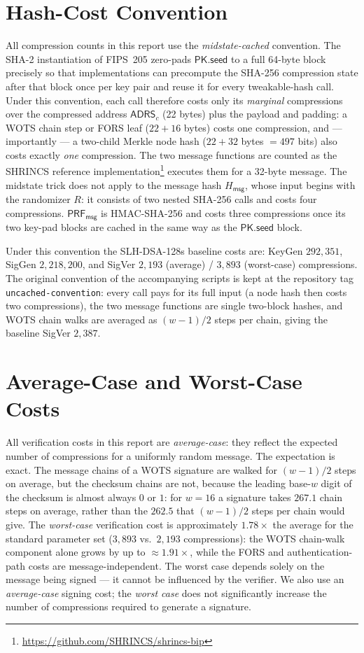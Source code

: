 \section{Hash-Cost Convention} \label{app:hash-convention}
All compression counts in this report use the \emph{midstate-cached} convention. The SHA-2 instantiation of FIPS~205 zero-pads $\mathsf{PK.seed}$ to a full 64-byte block precisely so that implementations can precompute the SHA-256 compression state after that block once per key pair and reuse it for every tweakable-hash call. Under this convention, each call therefore costs only its \emph{marginal} compressions over the compressed address $\mathsf{ADRS}_c$ (22 bytes) plus the payload and padding: a WOTS chain step or FORS leaf ($22 + 16$ bytes) costs one compression, and — importantly — a two-child Merkle node hash ($22 + 32$ bytes $= 497$ bits) also costs exactly \emph{one} compression. The two message functions are counted as the SHRINCS reference implementation\footnote{\url{https://github.com/SHRINCS/shrincs-bip}} executes them for a 32-byte message. The midstate trick does not apply to the message hash $H_{\mathsf{msg}}$, whose input begins with the randomizer $R$: it consists of two nested SHA-256 calls and costs four compressions. $\mathsf{PRF}_{\mathsf{msg}}$ is HMAC-SHA-256 and costs three compressions once its two key-pad blocks are cached in the same way as the $\mathsf{PK.seed}$ block.

Under this convention the SLH-DSA-128s baseline costs are: KeyGen $292{,}351$, SigGen $2{,}218{,}200$, and SigVer $2{,}193$ (average) / $3{,}893$ (worst-case) compressions. The original convention of the accompanying scripts is kept at the repository tag \texttt{uncached-convention}: every call pays for its full input (a node hash then costs two compressions), the two message functions are single two-block hashes, and WOTS chain walks are averaged as $(w-1)/2$ steps per chain, giving the baseline SigVer $2{,}387$.

\section{Average-Case and Worst-Case Costs} \label{app:average-case}
All verification costs in this report are \emph{average-case}: they reflect the expected number of compressions for a uniformly random message.
The expectation is exact. The message chains of a WOTS signature are walked for $(w-1)/2$ steps on average, but the checksum chains are not, because the leading base-$w$ digit of the checksum is almost always $0$ or $1$: for $w = 16$ a signature takes $267.1$ chain steps on average, rather than the $262.5$ that $(w-1)/2$ steps per chain would give.
The \emph{worst-case} verification cost is approximately $1.78\times$ the average for the standard parameter set ($3{,}893$ vs.\ $2{,}193$ compressions): the WOTS chain-walk component alone grows by up to ${\approx}1.91\times$, while the FORS and authentication-path costs are message-independent.
The worst case depends solely on the message being signed — it cannot be influenced by the verifier.
We also use an \emph{average-case} signing cost; the \emph{worst case} does not significantly increase the number of compressions required to generate a signature.

